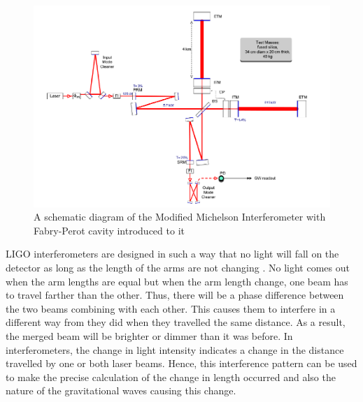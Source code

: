 \documentclass[colorlinks=true,pdfstartview=FitV,linkcolor=blue,
            citecolor=red,urlcolor=magenta]{ligodoc}
\begin{document}
 \begin{figure}[htbp]
\begin{center}
\includegraphics[width=5in]{ligosetup}
\caption{A schematic diagram of the Modified Michelson Interferometer with Fabry-Perot cavity introduced to it }
\label{fig:ligosetup}
\end{center}
\end{figure}   

LIGO interferometers are designed in such a way that no light will fall on the detector as long as the length of the arms are not changing \cite{gwavedetecturl}. No light comes out when the arm lengths are equal but when the arm length change, one beam has to travel farther than the other. Thus, there will be a phase difference between the two beams combining with each other. This causes them to interfere in a different way from they did when they travelled the same distance. As a result, the merged beam will be brighter or dimmer than it was before. In interferometers, the change in light intensity indicates a change in the distance travelled by one or both laser beams. Hence, this interference pattern can be used to make the precise calculation of the change in length occurred and also the nature of the gravitational waves causing this change.
\end{document}
